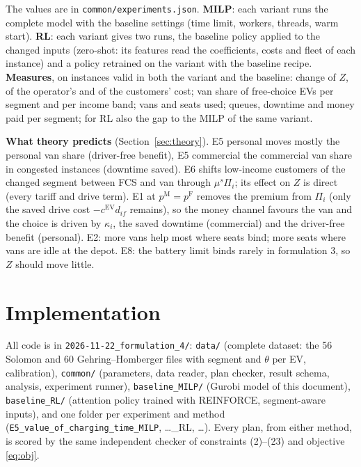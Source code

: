 \documentclass[12pt,a4paper]{article}
\begin{document}
The values are in \texttt{common/experiments.json}. \textbf{MILP}: each variant runs the complete model with the baseline settings (time limit, workers, threads, warm start). \textbf{RL}: each variant gives two runs, the baseline policy applied to the changed inputs (zero-shot: its features read the coefficients, costs and fleet of each instance) and a policy retrained on the variant with the baseline recipe. \textbf{Measures}, on instances valid in both the variant and the baseline: change of $Z$, of the operator's and of the customers' cost; van share of free-choice EVs per segment and per income band; vans and seats used; queues, downtime and money paid per segment; for RL also the gap to the MILP of the same variant.

\textbf{What theory predicts} (Section~\ref{sec:theory}). E5 personal moves mostly the personal van share (driver-free benefit), E5 commercial the commercial van share in congested instances (downtime saved). E6 shifts low-income customers of the changed segment between FCS and van through $\mu^{s}\Pi_i$; its effect on $Z$ is direct (every tariff and drive term). E1 at $p^{\mathrm M}=p^{\mathrm F}$ removes the premium from $\Pi_i$ (only the saved drive cost $-c^{\mathrm{EV}}d_{if}$ remains), so the money channel favours the van and the choice is driven by $\kappa_i$, the saved downtime (commercial) and the driver-free benefit (personal). E2: more vans help most where seats bind; more seats where vans are idle at the depot. E8: the battery limit binds rarely in formulation 3, so $Z$ should move little.

\section{Implementation}
All code is in \texttt{2026-11-22\_formulation\_4/}: \texttt{data/} (complete dataset: the 56 Solomon and 60 Gehring--Homberger files with segment and $\theta$ per EV, calibration), \texttt{common/} (parameters, data reader, plan checker, result schema, analysis, experiment runner), \texttt{baseline\_MILP/} (Gurobi model of this document), \texttt{baseline\_RL/} (attention policy trained with REINFORCE, segment-aware inputs), and one folder per experiment and method (\texttt{E5\_value\_of\_charging\_time\_MILP}, \dots\_RL, \dots). Every plan, from either method, is scored by the same independent checker of constraints (2)--(23) and objective \eqref{eq:obj}.

\end{document}
